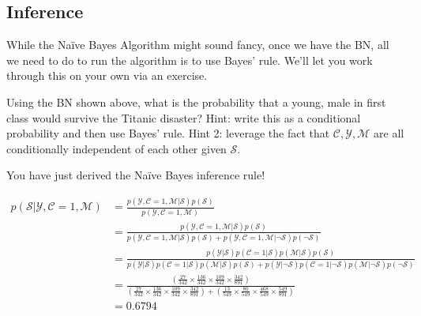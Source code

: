 \documentclass[assignment03_Solutions]{subfiles}
\begin{document}
\subsection{Inference}
While the Na\"ive Bayes Algorithm might sound fancy, once we have the BN, all we need to do to run the algorithm is to use Bayes' rule.  We'll let you work through this on your own via an exercise.

\begin{exercise}[(45 minutes)]

\bes
\item Using the BN shown above, what is the probability that a young, male in first class would survive the Titanic disaster?  Hint: write this as a conditional probability and then use Bayes' rule.  Hint 2: leverage the fact that $\mathcal{C}, \mathcal{Y}, \mathcal{M}$ are all conditionally independent of each other given $\mathcal{S}$.

You have just derived the Na\"ive Bayes inference rule!

\begin{boxedsolution}
\begin{align}
p(\mathcal{S}|\mathcal{Y}, \mathcal{C}=1, \mathcal{M}) &= \frac{p(\mathcal{Y}, \mathcal{C}=1, \mathcal{M}|\mathcal{S})p(\mathcal{S})}{p(\mathcal{Y}, \mathcal{C}=1, \mathcal{M})} \nonumber \\
&= \frac{p(\mathcal{Y}, \mathcal{C}=1, \mathcal{M}|\mathcal{S})p(\mathcal{S})}{p(\mathcal{Y}, \mathcal{C}=1, \mathcal{M}| \mathcal{S})p(\mathcal{S}) + p(\mathcal{Y}, \mathcal{C}=1, \mathcal{M}|\neg \mathcal{S})p(\neg \mathcal{S})} \nonumber \\
&=  \frac{p(\mathcal{Y}|\mathcal{S}) p( \mathcal{C}=1 | \mathcal{S}) p(\mathcal{M}|\mathcal{S})p(\mathcal{S})}{p(\mathcal{Y}|\mathcal{S}) p( \mathcal{C}=1 | \mathcal{S}) p(\mathcal{M}|\mathcal{S})p(\mathcal{S}) + p(\mathcal{Y}|\neg \mathcal{S}) p( \mathcal{C}=1 | \neg \mathcal{S}) p(\mathcal{M}|\neg \mathcal{S})p(\neg \mathcal{S})} \nonumber \\
&= \frac{\left ( \frac{27}{342} \times \frac{136}{342} \times \frac{109}{342}\times \frac{342}{891}\right)}{\left ( \frac{27}{342} \times \frac{136}{342} \times \frac{109}{342}\times \frac{342}{891} \right ) + \left ( \frac{13}{549} \times \frac{80}{549} \times \frac{468}{549}\times \frac{549}{891} \right )} \nonumber \\
&= 0.6794 \nonumber
\end{align}

\end{boxedsolution}


\end{exercise}
\end{document}
